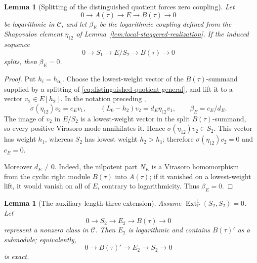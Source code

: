 \documentclass[12pt,leqno]{amsart}
\numberwithin{equation}{section}
\newtheorem{lem}[thm]{Lemma}
\newcommand{\Ext}{\operatorname{Ext}}
\begin{document}
\begin{lem}[Splitting of the distinguished quotient forces zero coupling]
\label{lem:split-forces-zero-coupling}
Let
\[
 0\longrightarrow A(\tau)\longrightarrow E\longrightarrow B(\tau)
 \longrightarrow0
\]
be logarithmic in $\mathscr C$, and let $\beta_E$ be the logarithmic
coupling defined from the Shapovalov element $\eta_{12}$ of
Lemma~\ref{lem:local-staggered-realization}.  If the induced sequence
\begin{equation}\label{eq:distinguished-quotient-general}
 0\longrightarrow S_1\longrightarrow E/S_2\longrightarrow B(\tau)
 \longrightarrow0
\end{equation}
splits, then $\beta_E=0$.
\end{lem}

\begin{proof}
Put $h_i=h_{\alpha_i}$.  Choose the lowest-weight vector of the
$B(\tau)$-summand supplied by a splitting of
\eqref{eq:distinguished-quotient-general}, and lift it to a vector
$v_2\in E[h_2]$.  In the notation preceding
\cite[Theorem~5.11]{Nakano},
\[
 \sigma(\eta_{12})v_2=c_Ev_1,
 \qquad
 (L_0-h_2)v_2=d_E\eta_{12}v_1,
 \qquad
 \beta_E=c_E/d_E.
\]
The image of $v_2$ in $E/S_2$ is a lowest-weight vector in the split
$B(\tau)$-summand, so every positive Virasoro mode annihilates it.  Hence
$\sigma(\eta_{12})v_2\in S_2$.  This vector has weight $h_1$, whereas
$S_2$ has lowest weight $h_2>h_1$; therefore
$\sigma(\eta_{12})v_2=0$ and $c_E=0$.

Moreover $d_E\ne0$.  Indeed, the nilpotent part $N_E$ is a Virasoro
homomorphism from the cyclic right module $B(\tau)$ into $A(\tau)$; if
it vanished on a lowest-weight lift, it would vanish on all of $E$,
contrary to logarithmicity.  Thus $\beta_E=0$.
\end{proof}

\begin{lem}[The auxiliary length-three extension]
\label{lem:local-auxiliary-extension}
Assume $\Ext^1_{\mathscr C}(S_2,S_2)=0$.  Let
\[
 0\longrightarrow S_2\longrightarrow E_2\longrightarrow
 B(\tau)\longrightarrow0
\]
represent a nonzero class in $\mathscr C$.  Then $E_2$ is logarithmic
and contains $B(\tau)'$ as a submodule; equivalently,
\begin{equation}\label{eq:auxiliary-E2}
 0\longrightarrow B(\tau)'\longrightarrow E_2
 \longrightarrow S_2\longrightarrow0
\end{equation}
is exact.
\end{lem}
\end{document}
